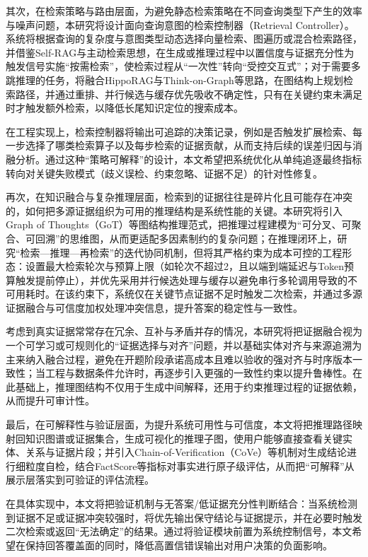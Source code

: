其次，在检索策略与路由层面，为避免静态检索策略在不同查询类型下产生的效率与噪声问题，本研究将设计面向查询意图的检索控制器（Retrieval Controller）。系统将根据查询的复杂度与意图类型动态选择向量检索、图遍历或混合检索路径，并借鉴Self-RAG\cite{ref8}与主动检索思想\cite{ref12}，在生成或推理过程中以置信度与证据充分性为触发信号实施“按需检索”，使检索过程从“一次性”转向“受控交互式”；对于需要多跳推理的任务，将融合HippoRAG\cite{ref14}与Think-on-Graph\cite{ref17}等思路，在图结构上规划检索路径，并通过重排、并行候选与缓存优先吸收不确定性，只有在关键约束未满足时才触发额外检索，以降低长尾知识定位的搜索成本。

在工程实现上，检索控制器将输出可追踪的决策记录，例如是否触发扩展检索、每一步选择了哪类检索算子以及每步检索的证据贡献，从而支持后续的误差归因与消融分析。通过这种“策略可解释”的设计，本文希望把系统优化从单纯追逐最终指标转向对关键失败模式（歧义误检、约束忽略、证据不足）的针对性修复。

再次，在知识融合与复杂推理层面，检索到的证据往往是碎片化且可能存在冲突的，如何把多源证据组织为可用的推理结构是系统性能的关键。本研究将引入Graph of Thoughts（GoT）\cite{ref5}等图结构推理范式，把推理过程建模为“可分叉、可聚合、可回溯”的思维图，从而更适配多因素制约的复杂问题；在推理闭环上，研究“检索—推理—再检索”的迭代协同机制，但将其严格约束为成本可控的工程形态：设置最大检索轮次与预算上限（如轮次不超过2，且以端到端延迟与Token预算触发提前停止），并优先采用并行候选处理与缓存以避免串行多轮调用导致的不可用耗时。在该约束下，系统仅在关键节点证据不足时触发二次检索，并通过多源证据融合与可信度加权处理冲突信息，提升答案的稳定性与一致性。

考虑到真实证据常常存在冗余、互补与矛盾并存的情况，本研究将把证据融合视为一个可学习或可规则化的“证据选择与对齐”问题，并以基础实体对齐与来源追溯为主来纳入融合过程，避免在开题阶段承诺高成本且难以验收的强对齐与时序版本一致性；当工程与数据条件允许时，再逐步引入更强的一致性约束以提升鲁棒性。在此基础上，推理图结构不仅用于生成中间解释，还用于约束推理过程的证据依赖，从而提升可审计性。

最后，在可解释性与验证层面，为提升系统可用性与可信度，本文将把推理路径映射回知识图谱或证据集合，生成可视化的推理子图，使用户能够直接查看关键实体、关系与证据片段；并引入Chain-of-Verification（CoVe）\cite{ref24}等机制对生成结论进行细粒度自检，结合FactScore\cite{ref25}等指标对事实进行原子级评估，从而把“可解释”从展示层落实到可验证的评估流程。

在具体实现中，本文将把验证机制与无答案/低证据充分性判断结合：当系统检测到证据不足或证据冲突较强时，将优先输出保守结论与证据提示，并在必要时触发二次检索或返回“无法确定”的结果。通过将验证模块前置为系统控制信号，本文希望在保持回答覆盖面的同时，降低高置信错误输出对用户决策的负面影响。

